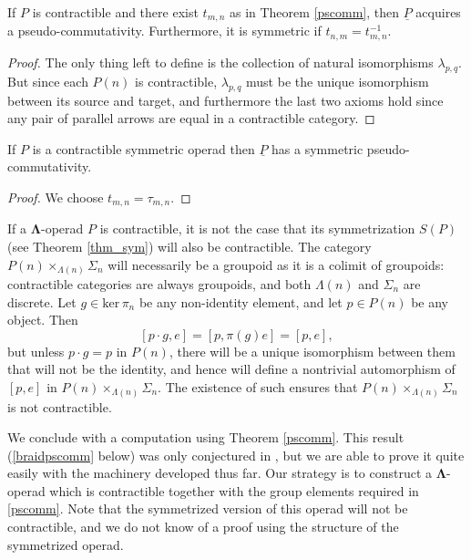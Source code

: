 \documentclass{amsbook} %
\newcommand{\ML}{\mathbf{\Lambda}}
\numberwithin{section}{chapter}
\begin{document}
\begin{cor}
If $P$ is contractible and there exist $t_{m,n}$ as in Theorem \ref{pscomm}, then $\underline{P}$ acquires a pseudo-commutativity. Furthermore, it is symmetric if $t_{n,m} = t_{m,n}^{-1}$.
\end{cor}
\begin{proof}
The only thing left to define is the collection of natural isomorphisms $\lambda_{p,q}$.  But since each $P(n)$ is contractible, $\lambda_{p,q}$ must be the unique isomorphism between its source and target, and furthermore the last two axioms hold since any pair of parallel arrows are equal in a contractible category.
\end{proof}

\begin{cor}
If $P$ is a contractible symmetric operad then $\underline{P}$ has a symmetric pseudo-commutativity.
\end{cor}
\begin{proof}
We choose $t_{m,n} = \tau_{m,n}$.
\end{proof}

\begin{rem}
If a $\ML$-operad $P$ is contractible, it is not the case that its symmetrization $S(P)$ (see Theorem \ref{thm_sym}) will also be contractible.  The category $P(n) \times_{\Lambda(n)} \Sigma_{n}$ will necessarily be a groupoid as it is a colimit of groupoids: contractible categories are always groupoids, and both $\Lambda(n)$ and $\Sigma_{n}$ are discrete.  Let $g \in \textrm{ker} \, \pi_{n}$ be any non-identity element, and let $p \in P(n)$ be any object.  Then
\[
[p \cdot g, e] = [p, \pi(g)e] = [p,e],
\]
but unless $p\cdot g = p$ in $P(n)$, there will be a unique isomorphism between them that will not be the identity, and hence will define a nontrivial automorphism of $[p,e]$ in  $P(n) \times_{\Lambda(n)} \Sigma_{n}$.  The existence of such ensures that $P(n) \times_{\Lambda(n)} \Sigma_{n}$ is not contractible.
\end{rem}



We conclude with a computation using Theorem \ref{pscomm}.  This result (\ref{braidpscomm} below) was only conjectured in \cite{HP}, but we are able to prove it quite easily with the machinery developed thus far.  Our strategy is to construct a $\ML$-operad which is contractible together with the group elements required in \ref{pscomm}.  Note that the symmetrized version of this operad will not be contractible, and we do not know of a proof using the structure of the symmetrized operad.
\end{document}
